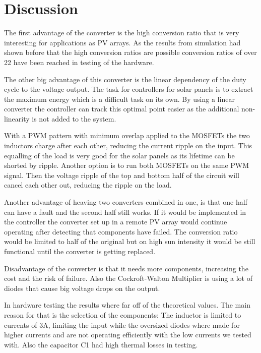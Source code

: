\chapter{Discussion}\label{ch:Discussion}


The first advantage of the converter is the high conversion ratio that is very interesting for applications as PV arrays. As the results from simulation had shown before that the high conversion ratios are possible conversion ratios of over 22 have been reached in testing of the hardware.


The other big advantage of this converter is the linear dependency of the duty cycle to the voltage output. The task for controllers for solar panels is to extract the maximum energy which is a difficult task on its own. 
By using a linear converter the controller can track this optimal point easier as the additional non-linearity is not added to the system.


With a PWM pattern with minimum overlap applied to the MOSFETs the two inductors charge after each other, reducing the current ripple on the input. This equalling of the load is very good for the solar panels as its lifetime can be shorted by ripple. \cite{Joseph_isbn978-3-8007-3343-9} %
Another option is to run both MOSFETs on the same PWM signal.
Then the voltage ripple of the top and bottom half of the circuit will cancel each other out, reducing the ripple on the load. 

Another advantage of heaving two converters combined in one, is that one half can have a fault and the second half still works.
If it would be implemented in the controller the converter set up in a remote PV array would continue operating after detecting that components have failed. 
The conversion ratio would be limited to half of the original but on high sun intensity it would be still functional until the converter is getting replaced.


Disadvantage of the converter is that it needs more components, increasing the cost and the risk of failure.
Also the Cockroft-Walton Multiplier is using a lot of diodes that cause big voltage drops on the output.

In hardware testing the results where far off of the theoretical values.
The main reason for that is the selection of the components: 
The inductor is limited to currents of 3A, limiting the input while the oversized diodes where made for higher currents and are not operating efficiently with the low currents we tested with.
Also the capacitor C1 had high thermal losses in testing.

